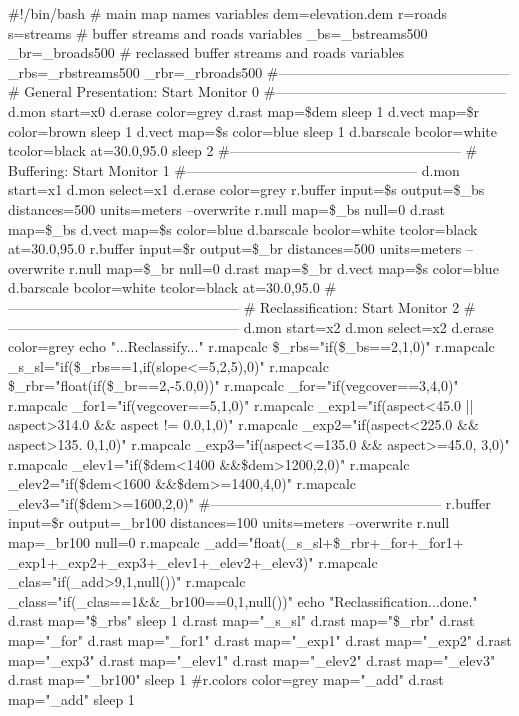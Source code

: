 \begin{smallverbatim}
#!/bin/bash
# main map names variables
dem=elevation.dem
r=roads
s=streams
# buffer streams and roads variables
_bs=_bstreams500
_br=_broads500
# reclassed buffer streams and roads variables
_rbs=_rbstreams500
_rbr=_rbroads500
#--------------------------------------------------
# General Presentation: Start Monitor 0
#--------------------------------------------------
d.mon start=x0
d.erase color=grey
d.rast map=\$dem
sleep 1
d.vect map=\$r color=brown
sleep 1
d.vect map=\$s color=blue
sleep 1
d.barscale bcolor=white tcolor=black at=30.0,95.0
sleep 2
#--------------------------------------------------
# Buffering: Start Monitor 1
#--------------------------------------------------
d.mon start=x1
d.mon select=x1
d.erase color=grey
r.buffer input=\$s output=\$_bs distances=500
 units=meters --overwrite
r.null map=\$_bs null=0
d.rast map=\$_bs
d.vect map=\$s color=blue
d.barscale bcolor=white tcolor=black at=30.0,95.0
r.buffer input=\$r output=\$_br distances=500
 units=meters --overwrite
r.null map=\$_br null=0
d.rast map=\$_br
d.vect map=\$s color=blue
d.barscale bcolor=white tcolor=black at=30.0,95.0
#--------------------------------------------------
# Reclassification: Start Monitor 2
#--------------------------------------------------
d.mon start=x2
d.mon select=x2
d.erase color=grey
echo "...Reclassify..."
r.mapcalc \$_rbs="if(\$_bs==2,1,0)"
r.mapcalc _s_sl="if(\$_rbs==1,if(slope<=5,2,5),0)"
r.mapcalc \$_rbr="float(if(\$_br==2,-5.0,0))"
r.mapcalc _for="if(vegcover==3,4,0)"
r.mapcalc _for1="if(vegcover==5,1,0)"
r.mapcalc _exp1="if(aspect<45.0 || aspect>314.0 &&
 aspect != 0.0,1,0)"
r.mapcalc _exp2="if(aspect<225.0 && aspect>135.
 0,1,0)"
r.mapcalc _exp3="if(aspect<=135.0 && aspect>=45.0,
 3,0)"
r.mapcalc _elev1="if(\$dem<1400 &&\$dem>1200,2,0)"
r.mapcalc _elev2="if(\$dem<1600 &&\$dem>=1400,4,0)"
r.mapcalc _elev3="if(\$dem>=1600,2,0)"
#--------------------------------------------------
r.buffer input=\$r output=_br100 distances=100
 units=meters --overwrite
r.null map=\_br100 null=0
r.mapcalc _add="float(_s_sl+\$_rbr+_for+_for1+
 _exp1+_exp2+_exp3+_elev1+_elev2+_elev3)"
r.mapcalc _clas="if(_add{>9,1,null())"
r.mapcalc _class="if(_clas==1&&_br100==0,1,null())"
echo "Reclassification...done."
d.rast map="\$_rbs"
sleep 1
d.rast map="_s_sl"
d.rast map="\$_rbr"
d.rast map="_for"
d.rast map="_for1"
d.rast map="_exp1"
d.rast map="_exp2"
d.rast map="_exp3"
d.rast map="_elev1"
d.rast map="_elev2"
d.rast map="_elev3"
d.rast map="_br100"
sleep 1
#r.colors color=grey map="_add"
d.rast map="_add"
sleep 1
}
\end{smallverbatim}
